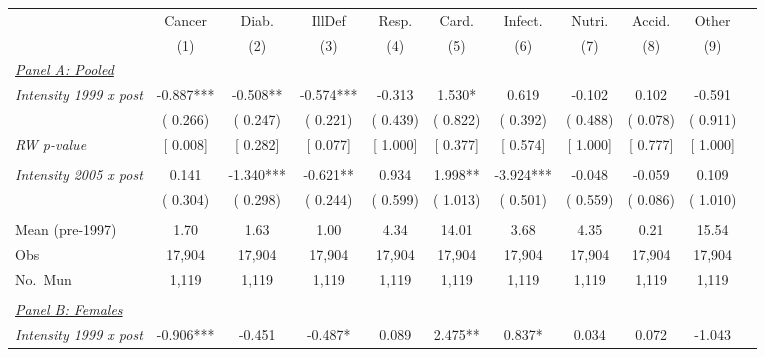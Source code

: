 \begin{tabular}{lcccccccccc} \hline \hline
& Cancer & Diab. & IllDef & Resp. & Card. & Infect. & Nutri. & Accid. & Other \\ 
\cmidrule(lr){2-2}\cmidrule(lr){3-3}\cmidrule(lr){4-4}\cmidrule(lr){5-5}\cmidrule(lr){6-6}\cmidrule(lr){7-7}\cmidrule(lr){8-8}\cmidrule(lr){9-9}\cmidrule(lr){10-10}
& \multicolumn{1}{c}{(1)} & \multicolumn{1}{c}{(2)} & \multicolumn{1}{c}{(3)} & \multicolumn{1}{c}{(4)} & \multicolumn{1}{c}{(5)} & \multicolumn{1}{c}{(6)} & \multicolumn{1}{c}{(7)} & \multicolumn{1}{c}{(8)} & \multicolumn{1}{c}{(9)} \\ \toprule
\underline{\textit{Panel A: Pooled}}  \\ 
\textit{Intensity 1999 x post} &       -0.887*** &       -0.508** &       -0.574*** &       -0.313 &        1.530* &        0.619 &       -0.102 &        0.102 &       -0.591 \\ 
 & (       0.266) & (       0.247) & (       0.221) & (       0.439) & (       0.822) & (       0.392) & (       0.488) & (       0.078) & (       0.911) \\ 
\textit{RW p-value} & [ 0.008] & [ 0.282] & [ 0.077] & [ 1.000] & [ 0.377] & [ 0.574] & [ 1.000] & [ 0.777] & [ 1.000] \\ 
  & & & & & & & & & \\ 
\textit{Intensity 2005 x post} &        0.141 &       -1.340*** &       -0.621** &        0.934 &        1.998** &       -3.924*** &       -0.048 &       -0.059 &        0.109 \\ 
 & (       0.304) & (       0.298) & (       0.244) & (       0.599) & (       1.013) & (       0.501) & (       0.559) & (       0.086) & (       1.010) \\ 
  & & & & & & & & & \\ 
Mean (pre-1997) &         1.70 &         1.63 &         1.00 &         4.34 &        14.01 &         3.68 &         4.35 &         0.21 &        15.54 \\ 
Obs &       17,904 &       17,904 &       17,904 &       17,904 &       17,904 &       17,904 &       17,904 &       17,904 &       17,904 \\ 
No.\ Mun &        1,119 &        1,119 &        1,119 &        1,119 &        1,119 &        1,119 &        1,119 &        1,119 &        1,119 \\ 
  & & & & & & & & & \\ 
\underline{\textit{Panel B: Females}}  \\ 
\textit{Intensity 1999 x post} &       -0.906*** &       -0.451 &       -0.487* &        0.089 &        2.475** &        0.837* &        0.034 &        0.072 &       -1.043 \\ 

\end{tabular}
